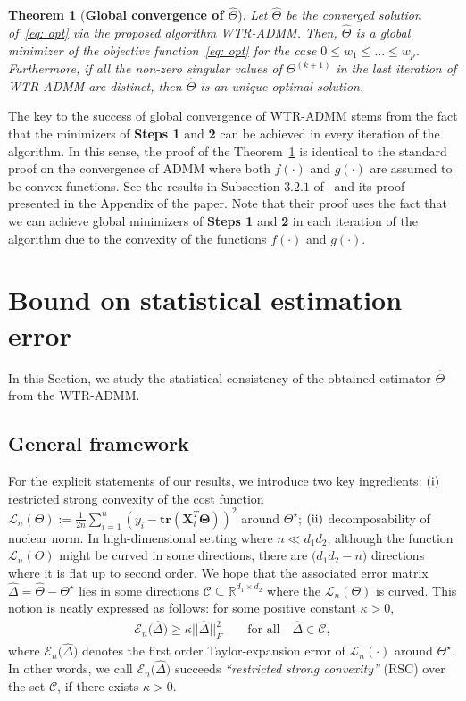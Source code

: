 \documentclass[12pt]{article}
\newcommand{\RN}[1]{%
  \textup{\uppercase\expandafter{\romannumeral#1}}%
}
\newtheorem{theorem}{Theorem}[section]
\begin{document}
\begin{theorem} [\textbf{Global convergence of $\widehat{\Theta}$}] \label{Thm1}
    Let $\widehat{\Theta}$ be the converged solution of~\eqref{eq: opt} via the proposed algorithm WTR-ADMM.
    Then, $\widehat{\Theta}$ is a global minimizer of the objective function~\eqref{eq: opt} for the case $0\leq w_{1}\leq\dots\leq w_{p}$.
    Furthermore, if all the non-zero singular values of $\Theta^{(k+1)}$ in the last iteration of WTR-ADMM are distinct, then $\widehat{\Theta}$ is an unique optimal solution.
\end{theorem}

The key to the success of global convergence of WTR-ADMM stems from the fact that the minimizers of \textbf{Steps 1} and \textbf{2} can be achieved in every iteration of the algorithm.
In this sense, the proof of the Theorem~\ref{Thm1} is identical to the standard proof on the convergence of ADMM where both $f(\cdot)$ and $g(\cdot)$ are assumed to be convex functions. 
See the results in Subsection $3.2.1$ of~\cite{boyd2011distributed} and its proof presented in the Appendix of the paper.
Note that their proof uses the fact that we can achieve global minimizers of \textbf{Steps 1} and \textbf{2} in each iteration of the algorithm 
due to the convexity of the functions $f(\cdot)$ and $g(\cdot)$.

\section{Bound on statistical estimation error}
In this Section, we study the statistical consistency of the obtained estimator $\widehat{\Theta}$ from the WTR-ADMM.
\subsection{General framework}
For the explicit statements of our results, we introduce two key ingredients: $(\RN{1})$ restricted strong convexity of the cost function $\mathcal{L}_{n}(\Theta):=\frac{1}{2n}\sum^{n}_{i=1} (y_{i} - \textbf{tr}(\mathbf{X}^{T}_{i}\boldsymbol{\Theta}))^2$ around $\Theta^\star$;
$(\RN{2})$ decomposability of nuclear norm.
In high-dimensional setting where $n \ll d_{1}d_{2}$, although the function $\mathcal{L}_{n}(\Theta)$ might be curved in some directions, there are $\big(d_{1}d_{2}-n\big)$ directions where it is flat up to second order. 
We hope that the associated error matrix $\widehat{\Delta}=\widehat{\Theta}-\Theta^{\star}$ 
lies in some directions $\mathcal{C}\subseteq \mathbb{R}^{d_{1}\times d_{2}}$ where the $\mathcal{L}_{n}(\Theta)$ is curved. 
This notion is neatly expressed as follows: for some positive constant $\kappa>0$,
\begin{align*}
    \mathcal{E}_{n}\big(\widehat{\Delta})\geq \kappa || \widehat{\Delta} ||_{F}^{2} \qquad \text{for all} \quad \widehat{\Delta}\in\mathcal{C},
\end{align*}
where $\mathcal{E}_{n}\big(\widehat{\Delta})$ denotes the first order Taylor-expansion error of $\mathcal{L}_{n}(\cdot)$ around $\Theta^\star$. 
In other words, we call $\mathcal{E}_{n}\big(\widehat{\Delta})$ succeeds \textit{``restricted strong convexity''} (RSC) over the set $\mathcal{C}$, if there exists $\kappa>0$.
\end{document}
